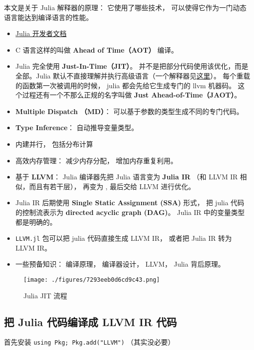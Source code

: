 
本文是关于 Julia 解释器的原理： 它使用了哪些技术， 可以使得它作为一门动态语言能达到编译语言的性能。

\begin{itemize}
\item \href{https://docs.julialang.org/en/v1/devdocs/init/}{Julia 开发者文档}
\item C 语言这样的叫做 \textbf{Ahead of Time（AOT）} 编译。
\item Julia 完全使用 \textbf{Just-In-Time（JIT）}。 并不是把部分代码使用该优化，而是全部。Julia 默认不直接理解并执行高级语言（一个解释器见\href{https://juliadebug.github.io/JuliaInterpreter.jl/stable/}{这里}）。 每个重载的函数第一次被调用的时候， julia 都会先给它生成专门的 llvm 机器码。 这个过程还有一个不那么正规的名字叫做 \textbf{Just Ahead-of-Time（JAOT）}。
\item \textbf{Multiple Dispatch （MD）}： 可以基于参数的类型生成不同的专门代码。
\item \textbf{Type Inference}： 自动推导变量类型。
\item 内建并行， 包括分布计算
\item 高效内存管理： 减少内存分配， 增加内存重复利用。
\item 基于 \textbf{LLVM}： Julia 编译器先把 Julia 语言变为 \textbf{Julia IR} （和 LLVM IR 相似，而且有若干层）， 再变为 , 最后交给 LLVM 进行优化。
\item Julia IR 后期使用 \textbf{Single Static Assignment (SSA)} 形式， 把 julia 代码的控制流表示为 \textbf{directed acyclic graph (DAG)}。 Julia IR 中的变量类型都是明确的。
\item \verb`LLVM.jl` 包可以把 julia 代码直接生成 LLVM IR， 或者把 Julia IR 转为 LLVM IR。
\item 一些预备知识： 编译原理， 编译器设计， LLVM， Julia 背后原理。
\end{itemize}

\begin{figure}[ht]
\centering
\texttt{[image: ./figures/7293eeb0d6cd9c43.png]}
\caption{Julia JIT 流程} \label{fig_julia0_1}
\end{figure}

\subsection{把 Julia 代码编译成 LLVM IR 代码}
首先安装 \verb`using Pkg; Pkg.add("LLVM")` （其实没必要）

